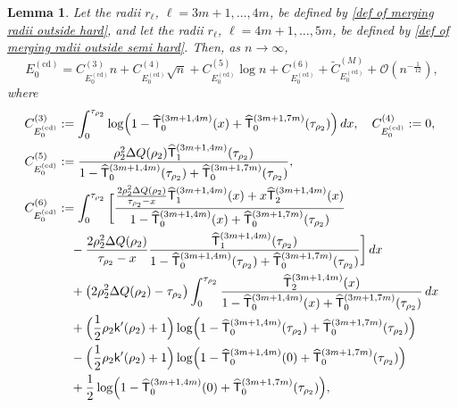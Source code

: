 \documentclass[a4paper]{article}
\newtheorem{lemma}[theorem]{Lemma}
\numberwithin{equation}{section}
\begin{document}
\begin{lemma}\label{lemma:asymptotic expansion E0 counting centered disk}
Let the radii $r_{\ell}$, $\ell=3m+1,\dots,4m$, be defined by
\eqref{def of merging radii outside hard}, and let the radii $r_{\ell}$,
$\ell=4m+1,\dots,5m$, be defined by
\eqref{def of merging radii outside semi hard}.  Then, as $n\to\infty$,
\[
    E_{0}^{(\mathrm{cd})}
    =
    C_{E_{0}^{(\mathrm{cd})}}^{(3)}n 
 +C_{E_{0}^{(\mathrm{cd})}}^{(4)}\sqrt{n}
 +C_{E_{0}^{(\mathrm{cd})}}^{(5)}\log n
 +C_{E_{0}^{(\mathrm{cd})}}^{(6)}
 +\widetilde{C}_{E_{0}^{(\mathrm{cd})}}^{(M)}
 +\mathcal{O}(n^{-\frac{1}{12}}),
\]  
where 
\begin{align*}
C_{E_{0}^{(\mathrm{cd})}}^{(3)}
&:=
\int_{0}^{\tau_{\rho_2}}
\log\Bigl(1-\widehat{\mathsf{T}}_0^{(3m+1,4m)}(x)+\widehat{\mathsf{T}}_0^{(3m+1,7m)}(\tau_{\rho_2})\Bigr)\,dx,
\quad
C_{E_{0}^{(\mathrm{cd})}}^{(4)}
:=0,
\\
C_{E_{0}^{(\mathrm{cd})}}^{(5)}
&:=\frac{\rho_2^2\Delta Q(\rho_2)\widehat{\mathsf{T}}_{1}^{(3m+1,4m)}(\tau_{\rho_2})}{1-\widehat{\mathsf{T}}_0^{(3m+1,4m)}(\tau_{\rho_2})+\widehat{\mathsf{T}}_0^{(3m+1,7m)}(\tau_{\rho_2})},
\\
C_{E_{0}^{(\mathrm{cd})}}^{(6)}
&:=
\int_{0}^{\tau_{\rho_2}}
\bigg[
\frac{\frac{2\rho_2^2\Delta Q(\rho_2)}{\tau_{\rho_2}-x}
\widehat{\mathsf{T}}_{1}^{(3m+1,4m)}(x)
+x\widehat{\mathsf{T}}_{2}^{(3m+1,4m)}(x)}{1-\widehat{\mathsf{T}}_0^{(3m+1,4m)}(x)+\widehat{\mathsf{T}}_0^{(3m+1,7m)}(\tau_{\rho_2})}
\\
&\quad 
-\frac{2\rho_2^2\Delta Q(\rho_2)}{\tau_{\rho_2}-x}
\frac{
\widehat{\mathsf{T}}_{1}^{(3m+1,4m)}(\tau_{\rho_2})}{1-\widehat{\mathsf{T}}_0^{(3m+1,4m)}(\tau_{\rho_2})+\widehat{\mathsf{T}}_0^{(3m+1,7m)}(\tau_{\rho_2})}
\bigg] \,dx 
\\
&\quad 
+\bigl( 
2\rho_2^2\Delta Q(\rho_2)-\tau_{\rho_2}
\bigr)\int_{0}^{\tau_{\rho_2}}
\frac{\widehat{\mathsf{T}}_{2}^{(3m+1,4m)}(x)}{1-\widehat{\mathsf{T}}_0^{(3m+1,4m)}(x)+\widehat{\mathsf{T}}_0^{(3m+1,7m)}(\tau_{\rho_2})}\,dx
\\
&
\quad
+
\Bigl(\frac{1}{2}\rho_2\mathsf{k}'(\rho_2)+1\Bigr)
\log\Bigl(1-\widehat{\mathsf{T}}_0^{(3m+1,4m)}(\tau_{\rho_2})+\widehat{\mathsf{T}}_0^{(3m+1,7m)}(\tau_{\rho_2})\Bigr)
\\
&\quad
-
\Bigl(\frac{1}{2}\rho_2\mathsf{k}'(\rho_2)+1\Bigr)
\log\Bigl(1-\widehat{\mathsf{T}}_0^{(3m+1,4m)}(0)+\widehat{\mathsf{T}}_0^{(3m+1,7m)}(\tau_{\rho_2})\Bigr)
\\
&\quad 
+\frac{1}{2}\log\Bigl(1-\widehat{\mathsf{T}}_0^{(3m+1,4m)}(0)+\widehat{\mathsf{T}}_0^{(3m+1,7m)}(\tau_{\rho_2})\Bigr),

\end{align*}
\end{lemma}
\end{document}
